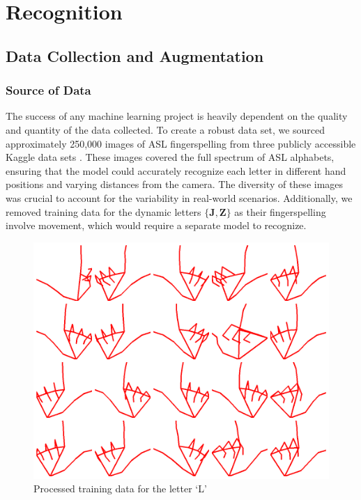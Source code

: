 \documentclass[../paper.tex]{subfiles}
\begin{document}
\section{Recognition}
\label{sec:recognition}

\subsection{Data Collection and Augmentation}

\subsubsection*{Source of Data}
The success of any machine learning project is heavily dependent on the quality and quantity of the data collected. To create a robust data set, we sourced approximately 250,000 images of ASL fingerspelling from three publicly accessible Kaggle data sets \cite{Kaggle1, Kaggle2, Kaggle3}. These images covered the full spectrum of ASL alphabets, ensuring that the model could accurately recognize each letter in different hand positions and varying distances from the camera. The diversity of these images was crucial to account for the variability in real-world scenarios. Additionally, we removed training data for the dynamic letters $\mathbf{\{J, Z\}}$ as their fingerspelling involve movement, which would require a separate model to recognize.

\begin{figure}[!htbp]
  \centerline{\includegraphics[width=\linewidth]{../figures/net-gallery.png}}
  \caption{Processed training data for the letter \lq L\rq}\label{fig:net_gallery}
\end{figure}
\end{document}
